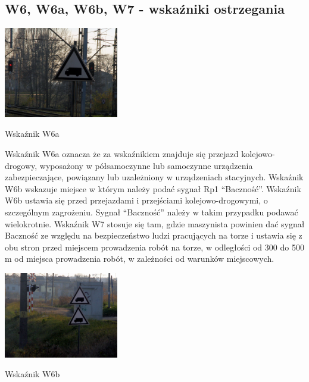 \subsection{W6, W6a, W6b, W7 - wskaźniki ostrzegania}
	\begin{marginfigure}
	\includegraphics[width=5cm]{skryptkierownik-img/skryptkierownik-img010.jpg}
	\caption{Wskaźnik W6a}
\end{marginfigure}
\begin{tcolorbox}[colback=black!5!white,colframe=white!55!black,title=Wskaźnik W6]
Wskaźnik W6a oznacza że za wskaźnikiem znajduje się przejazd kolejowo-drogowy, wyposażony w półsamoczynne lub samoczynne urządzenia zabezpieczające, powiązany lub uzależniony w urządzeniach stacyjnych.
Wskaźnik W6b wskazuje miejsce w którym należy podać sygnał Rp1 “Baczność”. Wskaźnik W6b ustawia się przed przejazdami i przejściami kolejowo-drogowymi, o szczególnym zagrożeniu. Sygnał “Baczność” należy w takim przypadku podawać wielokrotnie. Wskaźnik W7 stosuje się tam, gdzie maszynista powinien dać sygnał {\textquotedbl}Baczność{\textquotedbl} ze względu na bezpieczeństwo ludzi pracujących na torze i ustawia się z obu stron przed miejscem prowadzenia robót na torze, w odległości od 300 do 500 m od miejsca prowadzenia robót, w zależności od warunków miejscowych.
\end{tcolorbox}
	\begin{marginfigure}
		\includegraphics[width=5cm]{skryptkierownik-img/skryptkierownik-img011.jpg}
		\caption{Wskaźnik W6b}
	\end{marginfigure}

